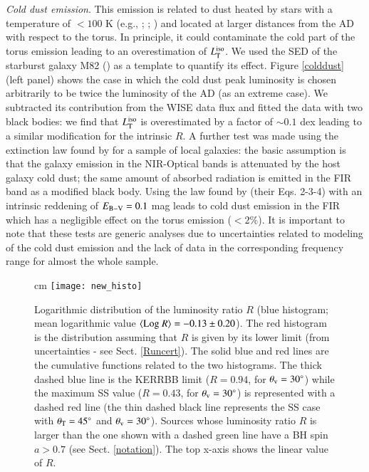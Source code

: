 \documentclass[]{aa}
\begin{document}
\textit{Cold dust emission}. This emission is related to dust heated by stars with a temperature of $<100$ K (e.g., \citealt{Bendo}; \citealt{Bose}; \citealt{Dale}) and located at larger distances from the AD with respect to the torus. In principle, it could contaminate the cold part of the torus emission leading to an overestimation of $L^{\rm iso}_{\rm T}$. We used the SED of the starburst galaxy M82 (\citealt{Kennetal}) as a template to quantify its effect. Figure \ref{colddust} (left panel) shows the case in which the cold dust peak luminosity is chosen arbitrarily to be twice the luminosity of the AD (as an extreme case). We subtracted its contribution from the WISE data flux and fitted the data with two black bodies: we find that $L^{\rm iso}_{\rm T}$ is overestimated by a factor of $\sim 0.1$ dex leading to a similar modification for the intrinsic $R$. A further test was made using the extinction law found by \citet{Calze} for a sample of local galaxies: the basic assumption is that the galaxy emission in the NIR-Optical bands is attenuated by the host galaxy cold dust; the same amount of absorbed radiation is emitted in the FIR band as a modified black body. Using the law found by \citet{Calze} (their Eqs. 2-3-4) with an intrinsic reddening of $E_{\rm B-V} = 0.1$ mag leads to cold dust emission in the FIR which has a negligible effect on the torus emission ($<2 \%$). It is important to note that these tests are generic analyses due to uncertainties related to modeling of the cold dust emission and the lack of data in the corresponding frequency range for almost the whole sample.

\begin{figure*}
\centering
{} cm
\texttt{[image: new\_histo]}
\caption{Logarithmic distribution of the luminosity ratio $R$ (blue histogram; mean logarithmic value $\langle {\rm Log}\ R \rangle = -0.13 \pm 0.20$). The red histogram is the distribution assuming that $R$ is given by its lower limit (from uncertainties - see Sect. \ref{Runcert}). The solid blue and red lines are the cumulative functions related to the two histograms. The thick dashed blue line is the KERRBB limit ($R = 0.94$, for $\theta_{\rm v} = 30^{\circ}$) while the maximum SS value ($R=0.43$, for $\theta_{\rm v} = 30^{\circ}$) is represented with a dashed red line (the thin dashed black line represents the SS case with $\theta_{\rm T} = 45^{\circ}$ and $\theta_{\rm v} = 30^{\circ}$). Sources whose luminosity ratio $R$ is larger than the one shown with a dashed green line have a BH spin $a>0.7$ (see Sect. \ref{notation}). The top x-axis shows the linear value of $R$.}
\label{ratio_all}
\end{figure*}
\end{document}
